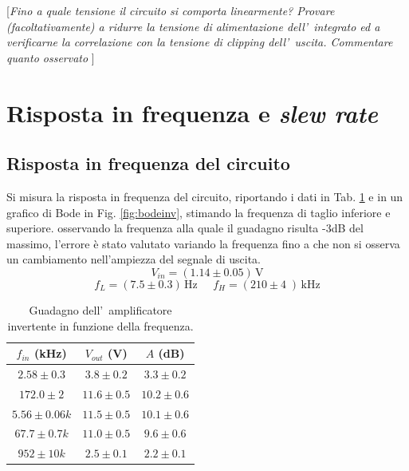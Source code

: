 \documentclass[10pt,a4paper]{article}
\newcommand{\rem}[1]{[\emph{#1}]}
\begin{document}
\rem{Fino a quale tensione il circuito si comporta linearmente? Provare (facoltativamente) a ridurre la 
tensione di alimentazione dell'~integrato ed a verificarne la correlazione con la tensione di 
\emph{clipping} dell'~uscita. Commentare quanto osservato }

%
\section{Risposta in frequenza e \emph{slew rate}}
\subsection{Risposta in frequenza del circuito}
Si misura la risposta in frequenza del circuito, riportando i dati  in Tab. \ref{tab:bodeinv} e
in un grafico di Bode in Fig. \ref{fig:bodeinv}, stimando la frequenza di taglio inferiore e 
superiore. osservando la frequenza alla quale il guadagno risulta -3dB del massimo, l'errore è stato valutato variando la frequenza fino a che non si osserva un cambiamento nell'ampiezza del segnale di uscita.
\[
V_{in} = (1.14 \pm 0.05 )\,\mathrm{V}
\]
\[
f_L = (7.5 \pm 0.3 )\,\mathrm{Hz}\;\;\;\;\;f_H = (210 \pm 4 \;)\,\mathrm{kHz}
\]
\begin{table}[h]
\caption{\small Guadagno dell'~amplificatore invertente in funzione della frequenza.}
\label{tab:bodeinv}
\begin{center}
\begin{tabular}{|c|c|c|}
\hline
$f_{in}$ (kHz) & $V_{out}$ (V) & $A$ (dB) \\
\hline
$2.58 \pm 0.3$& $ 3.8 \pm 0.2$& $3.3\pm 0.2$ \\ 
\hline
$172.0 \pm 2$& $ 11.6 \pm 0.5$& $10.2\pm 0.6$ \\
\hline
$5.56 \pm 0.06 k$& $ 11.5 \pm 0.5$& $10.1\pm 0.6$ \\ 
\hline
$67.7 \pm 0.7 k$& $ 11.0 \pm 0.5$& $9.6\pm 0.6$ \\ 
\hline
$952 \pm 10 k$& $ 2.5 \pm 0.1$& $2.2\pm 0.1$ \\ 
\hline
\end{tabular}
\end{center}
\end{table} 




 
\end{document}
